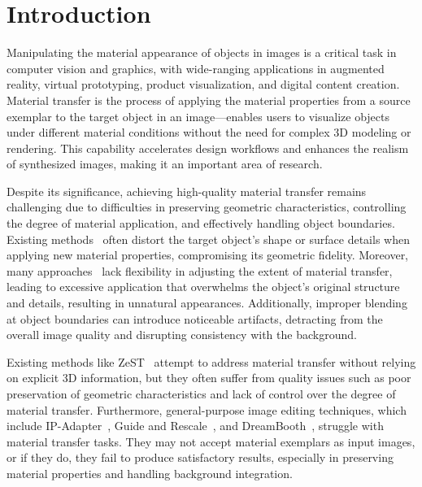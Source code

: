 \section{Introduction}
\label{sec:intro}

Manipulating the material appearance of objects in images is a critical task in computer vision and graphics, with wide-ranging applications in augmented reality, virtual prototyping, product visualization, and digital content creation. Material transfer is the process of applying the material properties from a source exemplar to the target object in an image—enables users to visualize objects under different material conditions without the need for complex 3D modeling or rendering. This capability accelerates design workflows and enhances the realism of synthesized images, making it an important area of research.

Despite its significance, achieving high-quality material transfer remains challenging due to difficulties in preserving geometric characteristics, controlling the degree of material application, and effectively handling object boundaries. Existing methods~\cite{yeh2024texturedreamer,richardson2023texture} often distort the target object's shape or surface details when applying new material properties, compromising its geometric fidelity. Moreover, many approaches~\cite{sharma2023alchemist,cheng2024zestzeroshotmaterialtransfer,titov2024guideandrescaleselfguidancemechanismeffective} lack flexibility in adjusting the extent of material transfer, leading to excessive application that overwhelms the object's original structure and details, resulting in unnatural appearances. Additionally, improper blending at object boundaries can introduce noticeable artifacts, detracting from the overall image quality and disrupting consistency with the background.

Existing methods like ZeST~\cite{cheng2024zestzeroshotmaterialtransfer} attempt to address material transfer without relying on explicit 3D information, but they often suffer from quality issues such as poor preservation of geometric characteristics and lack of control over the degree of material transfer. Furthermore, general-purpose image editing techniques, which include IP-Adapter~\cite{ye2023ipadaptertextcompatibleimage}, Guide and Rescale~\cite{titov2024guideandrescaleselfguidancemechanismeffective}, and DreamBooth~\cite{ruiz2023dreamboothfinetuningtexttoimage}, struggle with material transfer tasks. They may not accept material exemplars as input images, or if they do, they fail to produce satisfactory results, especially in preserving material properties and handling background integration.

